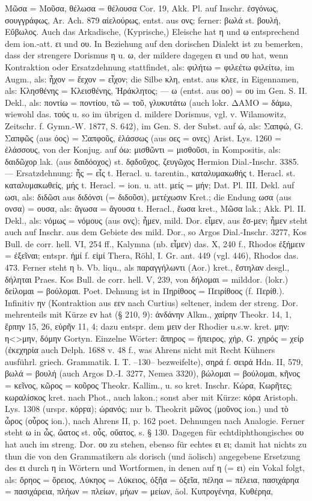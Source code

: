  Μῶσα = Μοῦσα, θέλωσα = θέλουσα Cor. 19, Akk. Pl. auf Inschr. ἐσγόνως, σουγγράφως, Ar. Ach. 879 αἰελούρως, entst. aus ονς; ferner: βωλά st. βουλή, Εὔβωλος. Auch das Arkadische, (Kyprische,) Eleische hat η und ω entsprechend dem ion.-att. ει und ου. In Beziehung auf den dorischen Dialekt ist zu bemerken, dass der strengere Dorismus η u. ω, der mildere dagegen ει und ου hat, wenn Kontraktion oder Ersatzdehnung stattfindet, als: φιλήτω = φιλεέτω φιλείτω, im Augm., als: ἦχον = ἔεχον = εἶχον; die Silbe κλη, entst. aus κλεε, in Eigennamen, als: Κλησθένης = Κλεισθένης, Ἡράκλητος; — ω (entst. aus οο) = ου im Gen. S. II. Dekl., als: ποντίω = ποντίου, τῶ = τοῦ, γλυκυτάτω (auch lokr. ΔΑΜΟ = δάμω, wiewohl das. τούς u. so im übrigen d. mildere Dorismus, vgl. v. Wilamowitz, Zeitschr. f. Gymn.-W. 1877, S. 642), im Gen. S. der Subst. auf ώ, als: Σαπφώ, G. Σαπφῶς (aus όος) = Σαπφοῦς, ἐλάσσως (aus οες = ονες) Arist. Lys. 1260 = ἐλάσσους, von der Konjug. auf όω: μισθῶντι = μισθοῦσι, in Kompositis, als: δαιδῶχορ lak. (aus δαιδόοχος) st. δᾳδοῦχος, ζευγῶχος Hermion Dial.-Inschr. 3385. — Ersatzdehnung: ἧς = εἷς t. Heracl. u. tarentin., καταλυμακωθής t. Heracl. st. καταλυμακωθείς, μής t. Heracl. = ion. u. att. μείς = μήν; Dat. Pl. III. Dekl. auf ωσι, als: διδῶσι aus διδόνσι (= διδοῦσι), μετέχωσιν Kret.; die Endung ωσα (aus ονσα) = ουσα, als: ἄγωσα = ἄγουσα t. Heracl., ἔωσα kret., Μῶσα lak.; Akk. Pl. II. Dekl., als: νόμως = νόμους (aus ονς); ἦμεν, mild. Dor. εἶμεν, aus ἔσ-μεν; ἦμεν steht auch auf Inschr. aus dem Gebiete des mild. Dor., so Argos Dial.-Inschr. 3277, Kos Bull. de corr. hell. VI, 254 ff., Kalymna (nb. εἶμεν) das. X, 240 f., Rhodos ἐξήμειν = ἐξεῖναι; entspr. ἠμί f. εἰμί Thera, Röhl, I. Gr. ant. 449 (vgl. 446), Rhodos das. 473. Ferner steht η b. Vb. liqu., als παραγγήλωντι (Aor.) kret., ἔστηλαν desgl., δήληται Praes. Kos Bull. de corr. hell. V, 239, von δήλομαι = milddor. (lokr.) δείλομαι = βούλομαι. Poet. Dehnung ist in Πηρίθοος = Πειρίθοος (f. Περίθ.). Infinitiv ην (Kontraktion aus εεν nach Curtius) seltener, indem der streng. Dor. mehrenteils mit Kürze εν hat (§ 210, 9): ἁνδάνην Alkm., χαίρην Theokr. 14, 1, ἕρπην 15, 26, εὑρῆν 11, 4; dazu entspr. dem μειν der Rhodier u.s.w. kret. μην: η<>μην, δόμην Gortyn. Einzelne Wörter: ἄπηρος = ἤπειρος, χήρ, G. χηρός = χείρ (ἐκεχηρία auch Delph. 1688 v. 48 f., was Ahrens nicht mit Recht Kühners ausführl. griech. Grammatik. I. T. --130-- bezweifelte), σηρά f. σειρά Hdn. II, 579, βωλά = βουλή (auch Argos D.-I. 3277, Nemea 3320), βώλομαι = βούλομαι, κῆνος = κεῖνος, κῶρος = κοῦρος Theokr. Kallim., u. so kret. Inschr. Κώρα, Κωρῆτες; κωραλίσκος kret. nach Phot., auch lakon.; sonst aber mit Kürze: κόρα Aristoph. Lys. 1308 (urspr. κόρϝα); ὠρανός; nur b. Theokrit μῶνος (μοῦνος ion.) und τὸ ὦρος (οὖρος ion.), nach Ahrens II, p. 162 poet. Dehnungen nach Analogie. Ferner steht ω in ὦς, ὤατος st. οὖς, οὔατος, s. § 130. Dagegen für echtdiphthongisches ου hat auch im streng. Dor. ου zu stehen, ebenso für echtes ει ει; damit hat nichts zu thun die von den Grammatikern als dorisch (und äolisch) angegebene Ersetzung des ει durch η in Wörtern und Wortformen, in denen auf η (= ει) ein Vokal folgt, als: ὄρηος = ὄρειος, Λύκηος = Λύκειος, ὀξῆα = ὀξεῖα, πέληα = πέλεια, πασιχάρηα = πασιχάρεια, πλήων = πλείων, μήων = μείων, äol. Κυπρογένηα, Κυθέρηα, 
